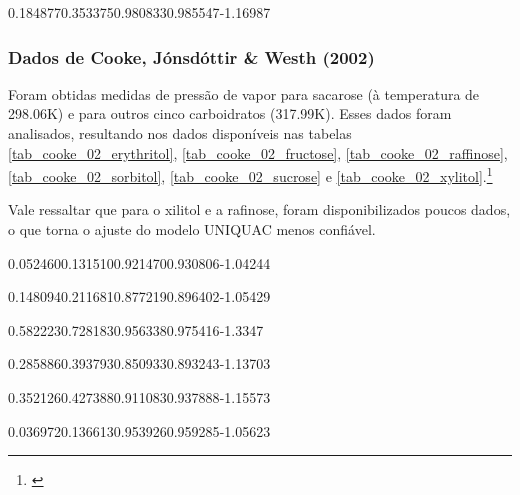 %
	{0.184877}{0.353375}{0.980833}{0.985547}{-1.16987}

\FloatBarrier

\subsubsection{Dados de Cooke, Jónsdóttir \& Westh (2002)}

Foram obtidas medidas de pressão de vapor para sacarose (à temperatura de 298.06K)
e para outros cinco carboidratos (317.99K). Esses dados foram analisados,
resultando nos dados disponíveis nas tabelas \ref{tab_cooke_02_erythritol},
\ref{tab_cooke_02_fructose}, \ref{tab_cooke_02_raffinose},
\ref{tab_cooke_02_sorbitol}, \ref{tab_cooke_02_sucrose} e
\ref{tab_cooke_02_xylitol}.\footnote{\cite{cooke2002a}}

Vale ressaltar que para o xilitol e a rafinose, foram disponibilizados poucos
dados, o que torna o ajuste do modelo UNIQUAC menos confiável.

%
	{0.052460}{0.131510}{0.921470}{0.930806}{-1.04244}

%
	{0.148094}{0.211681}{0.877219}{0.896402}{-1.05429}

%
	{0.582223}{0.728183}{0.956338}{0.975416}{-1.3347}

%
	{0.285886}{0.393793}{0.850933}{0.893243}{-1.13703}

%
	{0.352126}{0.427388}{0.911083}{0.937888}{-1.15573}

%
	{0.036972}{0.136613}{0.953926}{0.959285}{-1.05623}

